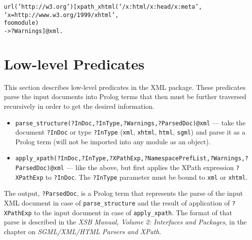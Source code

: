 \begin{alltt}	
    url('http://w3.org')[xpath_xhtml('/x:html/x:head/x:meta',
                                     'x=http://www.w3.org/1999/xhtml',
                                     foomodule)
                         -> ?Warnings]@\bs{}xml.
\end{alltt}

\section{Low-level Predicates}

This section describes low-level predicates in the XML package. These
predicates parse the input documents into Prolog terms that then must be
further traversed recursively in order to get the desired information.
\begin{itemize}
\item
  \texttt{parse\_structure(?InDoc,?InType,?Warnings,?ParsedDoc)@\bs{}xml}
  --- take the document \texttt{?InDoc} or type \texttt{?InType}
  (\texttt{xml}, \texttt{xhtml},  \texttt{html},  \texttt{sgml}) and parse
  it as a Prolog term (will not be imported 
  into any module as an object).
\item
  \texttt{apply\_xpath(?InDoc,?InType,?XPathExp,?NamespacePrefList,?Warnings,?ParsedDoc)@\bs{}xml}
  --- like the above, but first applies the XPath expression
  \texttt{?XPathExp} to \texttt{?InDoc}. The \texttt{?InType} parameter
  must be bound to \texttt{xml} or \texttt{xhtml}.      
\end{itemize}
The output, \texttt{?ParsedDoc},  is a Prolog term that represents the
parse of the input XML document in case of \texttt{parse\_structure} and the
result of application of \texttt{?XPathExp} to the input document in case
of \texttt{apply\_xpath}. The format of that parse is described in the 
\emph{XSB Manual, Volume 2: Interfaces and Packages}, in the chapter on
\emph{SGML/XML/HTML Parsers and XPath}.  


